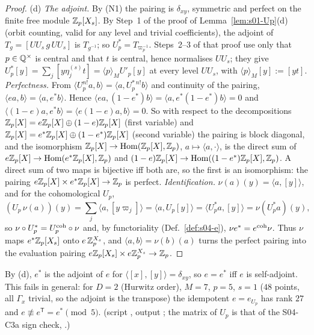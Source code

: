\begin{proof}
(d) \emph{The adjoint.} By (N1) the pairing is $\delta_{xy}$, symmetric and perfect on the finite free module $\mathbb{Z}_p[X_s]$. By Step~1 of
the proof of Lemma~\ref{lem:s01-Up}(d) (orbit counting, valid for any level and trivial coefficients), the adjoint of
$T_g=[UU_s\,g\,UU_s]$ is $T_{g^{-1}}$; so $U_p^*=T_{\varpi_p^{-1}}$. Steps~2--3 of that proof use only that $p\in\mathbb{Q}^\times$ is central
and that $t$ is central, hence normalises $UU_s$; they give $U_p^*[y]=\sum_j[y\eta^{(s)}_jt]=\langle p\rangle_MU'_p[y]$ at every level
$UU_s$, with $\langle p\rangle_M[y]:=[yt]$. \emph{Perfectness.} From $\langle U_p^{n!}a,b\rangle=\langle a,U_p^{*\,n!}b\rangle$ and
continuity of the pairing, $\langle ea,b\rangle=\langle a,e^*b\rangle$. Hence $\langle ea,(1-e^*)b\rangle=\langle a,e^*(1-e^*)b\rangle=0$ and
$\langle(1-e)a,e^*b\rangle=\langle e(1-e)a,b\rangle=0$. So with respect to the decompositions $\mathbb{Z}_p[X]=e\mathbb{Z}_p[X]\oplus(1-e)\mathbb{Z}_p[X]$ (first
variable) and $\mathbb{Z}_p[X]=e^*\mathbb{Z}_p[X]\oplus(1-e^*)\mathbb{Z}_p[X]$ (second variable) the pairing is block diagonal, and the isomorphism
$\mathbb{Z}_p[X]\to\operatorname{Hom}(\mathbb{Z}_p[X],\mathbb{Z}_p)$, $a\mapsto\langle a,\cdot\rangle$, is the direct sum of $e\mathbb{Z}_p[X]\to\operatorname{Hom}(e^*\mathbb{Z}_p[X],\mathbb{Z}_p)$ and
$(1-e)\mathbb{Z}_p[X]\to\operatorname{Hom}((1-e^*)\mathbb{Z}_p[X],\mathbb{Z}_p)$. A direct sum of two maps is bijective iff both are, so the first is an isomorphism:
the pairing $e\mathbb{Z}_p[X]\times e^*\mathbb{Z}_p[X]\to\mathbb{Z}_p$ is perfect. \emph{Identification.} $\nu(a)(y)=\langle a,[y]\rangle$, and for the
cohomological $U_p$,
\[(U_p\,\nu(a))(y)=\sum_j\langle a,[y\varpi_j]\rangle=\langle a,U_p[y]\rangle=\langle U_p^*a,[y]\rangle=\nu(U_p^*a)(y),\]
so $\nu\circ U_p^*=U_p^{\rm coh}\circ\nu$ and, by functoriality (Def.~\ref{def:s04-e}), $\nu e^*=e^{\rm coh}\nu$. Thus $\nu$ maps
$e^*\mathbb{Z}_p[X_s]$ onto $e\,\mathbb{Z}_p^{X_s}$, and $\langle a,b\rangle=\nu(b)(a)$ turns the perfect pairing into the evaluation pairing
$e\mathbb{Z}_p[X_s]\times e\mathbb{Z}_p^{X_s}\to\mathbb{Z}_p$.
\end{proof}
\begin{remark}[$e\ne e^*$]\label{rem:s04-eestar}
By (d), $e^*$ is the adjoint of $e$ for $\langle[x],[y]\rangle=\delta_{xy}$, so $e=e^*$ iff $e$ is self-adjoint. This fails in general:
for $D=2$ (Hurwitz order), $M=7$, $p=5$, $s=1$ ($48$ points, all $\Gamma_x$ trivial, so the adjoint is the transpose) the idempotent
$e=e_{U_p}$ has rank $27$ and $e\not\equiv e^{\mathsf T}=e^*\pmod 5$. \stcomp{} (script
, output ; the matrix of
$U_p$ is that of the S04-C3a sign check, .)
\end{remark}

